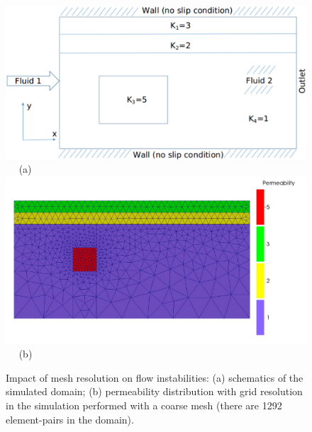 \begin{landscape}
\begin{figure}[ht] 
\vbox{
\hbox{\hspace{4.0cm}
\includegraphics[width=.75\textwidth]{./Pics/map_of_boundaries.pdf} 
}
\vspace{0.0cm}
\hbox{\hspace{6.5cm} (a) 
}
\vspace{0.25cm}
\hbox{\hspace{4.0cm}
\includegraphics[width=.9\textwidth]{./Pics1/Four_regions_coarse_MeshPermeability}
}
\vspace{0.0cm}
\hbox{\hspace{9cm} (b)      
}
}     
\caption{Impact of mesh resolution on flow instabilities: (a) schematics of the simulated domain; (b) permeability distribution with grid resolution in the simulation performed with a coarse mesh (there are 1292  element-pairs in the domain).}
\label{fig:testcase_heter_domain}
\end{figure}
\end{landscape}
\clearpage



